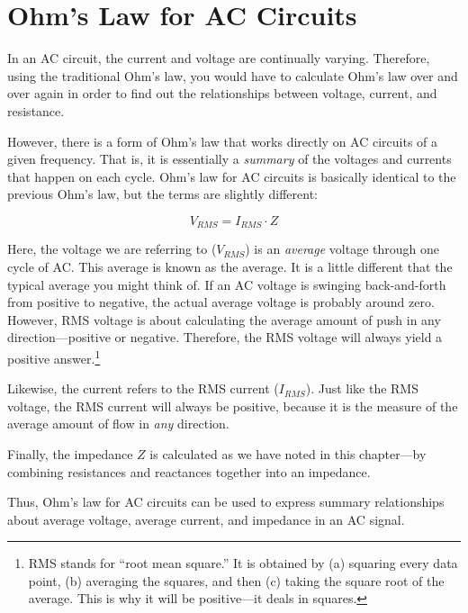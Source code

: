 \section{Ohm's Law for AC Circuits}

In an AC circuit, the current and voltage are continually varying.
Therefore, using the traditional Ohm's law, you would have to calculate Ohm's law over and over again in order to find out the relationships between voltage, current, and resistance.

However, there is a form of Ohm's law that works directly on AC circuits of a given frequency.
That is, it is essentially a \emph{summary} of the voltages and currents that happen on each cycle.
Ohm's law for AC circuits is basically identical to the previous Ohm's law, but the terms are slightly different:

\begin{equation}
\label{eqOhmsLawAC}
V_{RMS} = I_{RMS} \cdot Z
\end{equation}

Here, the voltage we are referring to ($V_{RMS}$) is an \emph{average} voltage through one cycle of AC.
This average is known as the  average.
It is a little different that the typical average you might think of.
If an AC voltage is swinging back-and-forth from positive to negative, the actual average voltage is probably around zero.
However, RMS voltage is about calculating the average amount of push in any direction---positive or negative.
Therefore, the RMS voltage will always yield a positive answer.\footnote{RMS stands for ``root mean square.'' It is obtained by (a) squaring every data point, (b) averaging the squares, and then (c) taking the square root of the average.  This is why it will be positive---it deals in squares.}

Likewise, the current refers to the RMS current ($I_{RMS}$).
Just like the RMS voltage, the RMS current will always be positive, because it is the measure of the average amount of flow in \emph{any} direction.

Finally, the impedance $Z$ is calculated as we have noted in this chapter---by combining resistances and reactances together into an impedance.

Thus, Ohm's law for AC circuits can be used to express summary relationships about average voltage, average current, and impedance in an AC signal.

